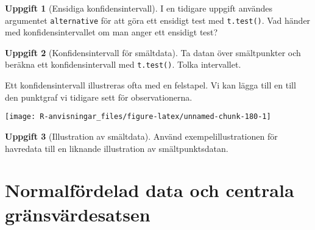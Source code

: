 \documentclass[
]{book}
\newenvironment{Shaded}{\begin{snugshade}}{\end{snugshade}}
\newcommand{\AttributeTok}[1]{\textcolor[rgb]{0.77,0.63,0.00}{#1}}
\newcommand{\DecValTok}[1]{\textcolor[rgb]{0.00,0.00,0.81}{#1}}
\newcommand{\FloatTok}[1]{\textcolor[rgb]{0.00,0.00,0.81}{#1}}
\newcommand{\FunctionTok}[1]{\textcolor[rgb]{0.00,0.00,0.00}{#1}}
\newcommand{\NormalTok}[1]{#1}
\newcommand{\OtherTok}[1]{\textcolor[rgb]{0.56,0.35,0.01}{#1}}
\newcommand{\SpecialCharTok}[1]{\textcolor[rgb]{0.00,0.00,0.00}{#1}}
\newcommand{\StringTok}[1]{\textcolor[rgb]{0.31,0.60,0.02}{#1}}
\theoremstyle{definition}
\theoremstyle{definition}
\theoremstyle{definition}
\newtheorem{exercise}{Uppgift}[chapter]
\theoremstyle{definition}
\theoremstyle{remark}
\begin{document}
\begin{exercise}[Ensidiga konfidensintervall]
I en tidigare uppgift användes argumentet \texttt{alternative} för att göra ett ensidigt test med \texttt{t.test()}. Vad händer med konfidensintervallet om man anger ett ensidigt test?
\end{exercise}

\begin{exercise}[Konfidensintervall för smältdata]
Ta datan över smältpunkter och beräkna ett konfidensintervall med \texttt{t.test()}. Tolka intervallet.
\end{exercise}

Ett konfidensintervall illustreras ofta med en felstapel. Vi kan lägga till en till den punktgraf vi tidigare sett för observationerna.

\begin{Shaded}
\end{Shaded}

\begin{center}\texttt{[image: R-anvisningar\_files/figure-latex/unnamed-chunk-180-1]} \end{center}

\begin{exercise}[Illustration av smältdata]
Använd exempelillustrationen för havredata till en liknande illustration av smältpunktsdatan.
\end{exercise}

\hypertarget{normalfuxf6rdelad-data-och-centrala-gruxe4nsvuxe4rdesatsen}{%
\section{Normalfördelad data och centrala gränsvärdesatsen}\label{normalfuxf6rdelad-data-och-centrala-gruxe4nsvuxe4rdesatsen}}
\end{document}
